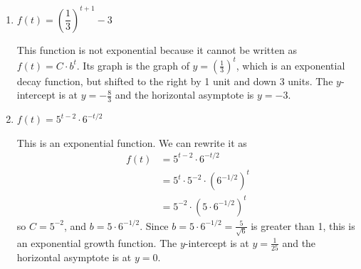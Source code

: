 \documentclass{article}
\begin{document}
\begin{enumerate}
\begin{enumerate}
\begin{solution}
    \end{solution}

  \item
    \begin{problem}[\vfill]
      $f(t) = \left( \dfrac{1}{3} \right)^{t + 1} - 3$
    \end{problem}

    \begin{solution}
      This function is not exponential because it cannot be written as $f(t)=C\cdot b^t$.
      Its graph is the graph of $y=(\frac{1}{3})^t$, which is an exponential decay
      function, but shifted to the right
      by 1 unit and down 3 units. The $y$-intercept is at $y=-\frac{8}{3}$ and 
      the horizontal asymptote is $y=-3$.

    \end{solution}

  \item


    \begin{problem}[\vfill]
      $f(t) = 5^{t - 2} \cdot 6^{-t/2}$
    \end{problem}

    \begin{solution}
      This is an exponential function. We can rewrite it as
      \begin{align*} 
        f(t) &= 5^{t-2}\cdot 6^{-t/2} \\
        &= 5^t \cdot 5^{-2} \cdot (6^{-1/2})^t \\
        &= 5^{-2} \cdot (5 \cdot 6^{-1/2})^t
      \end{align*}
      so $C=5^{-2}$, and $b = 5\cdot 6^{-1/2}$. Since 
      $b=5\cdot 6^{-1/2}=\frac{5}{\sqrt{6}}$ is greater than 1, this is an exponential
      growth function. The $y$-intercept is at $y=\frac{1}{25}$ and the horizontal
      asymptote is at $y=0$.


\end{solution}
\end{enumerate}
\end{enumerate}
\end{document}
